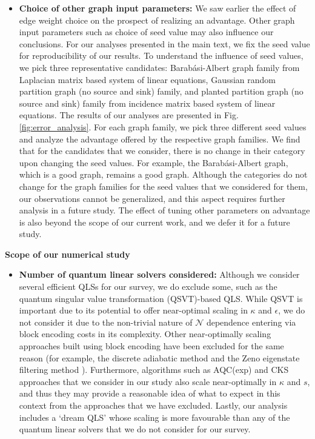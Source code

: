 \documentclass[%
 reprint,
 superscriptaddress,
 amsmath,amssymb,
 aps,
 pra,
floatfix,
nofootinbib,
]{revtex4-2}
\theoremstyle{definition}
\theoremstyle{remark}
\newcommand{\appsubsection}[1]{%
  \refstepcounter{subsection}%
  \bigskip
  \noindent\textbf{\thesubsection\quad #1}\par
  \smallskip
}
\begin{document}
\begin{appendix}
\begin{itemize}
\item \textbf{Choice of other graph input parameters: }We saw earlier the effect of edge weight choice on the prospect of realizing an advantage. Other graph input parameters such as choice of seed value may also influence our conclusions. For our analyses presented in the main text, we fix the seed value for reproducibility of our results. To understand the influence of seed values, we pick three representative candidates: Barabási-Albert graph family from Laplacian matrix based system of linear equations, Gaussian random partition graph (no source and sink) family, and planted partition graph (no source and sink) family from incidence matrix based system of linear equations. The results of our analyses are presented in Fig. \ref{fig:error_analysis}. For each graph family, we pick three different seed values and analyze the advantage offered by the respective graph families. We find that for the candidates that we consider, there is no change in their category upon changing the seed values. For example, the Barabási-Albert graph, which is a good graph, remains a good graph. Although the categories do not change for the graph families for the seed values that we considered for them, our observations cannot be generalized, and this aspect requires further analysis in a future study. The effect of tuning other parameters on advantage is also beyond the scope of our current work, and we defer it for a future study. \\
\end{itemize} 

\appsubsection{Scope of our numerical study} 

\begin{itemize}

\item \textbf{Number of quantum linear solvers considered: }Although we consider several efficient QLSs for our survey, we do exclude some, such as the quantum singular value transformation (QSVT)-based QLS. While QSVT is important due to its potential to offer near-optimal scaling in $\kappa$ and $\epsilon$, we do not consider it due to the non-trivial nature of $\mathcal{N}$ dependence entering via block encoding costs in its complexity. Other near-optimally scaling approaches built using block encoding have been excluded for the same reason (for example, the discrete adiabatic method \cite{costa2022optimal} and the Zeno eigenstate filtering method \cite{Lin2020optimalpolynomial}). Furthermore, algorithms such as AQC(exp) and CKS approaches that we consider in our study also scale near-optimally in $\kappa$ and $s$, and thus they may provide a reasonable idea of what to expect in this context from the approaches that we have excluded. Lastly, our analysis includes a `dream QLS' whose scaling is more favourable than any of the quantum linear solvers that we do not consider for our survey. 


\end{itemize}
\end{appendix}
\end{document}
